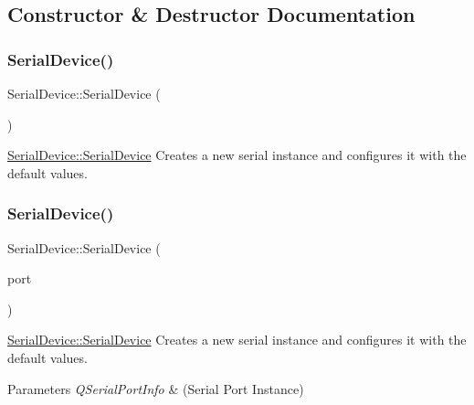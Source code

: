 \subsection{Constructor \& Destructor Documentation}
\hypertarget{class_serial_device_aad126bede3b0adf49e1fbe3afd7c6c42}{}\label{class_serial_device_aad126bede3b0adf49e1fbe3afd7c6c42} 
\subsubsection{\texorpdfstring{Serial\+Device()}{SerialDevice()}\hspace{0.1cm}{\footnotesize\ttfamily [1/5]}}
{\footnotesize\ttfamily Serial\+Device\+::\+Serial\+Device (\begin{DoxyParamCaption}{ }\end{DoxyParamCaption})}



\hyperlink{class_serial_device_aad126bede3b0adf49e1fbe3afd7c6c42}{Serial\+Device\+::\+Serial\+Device} Creates a new serial instance and configures it with the default values. 

\hypertarget{class_serial_device_aa0b6d87aea8d882096abe85fda113b26}{}\label{class_serial_device_aa0b6d87aea8d882096abe85fda113b26} 
\subsubsection{\texorpdfstring{Serial\+Device()}{SerialDevice()}\hspace{0.1cm}{\footnotesize\ttfamily [2/5]}}
{\footnotesize\ttfamily Serial\+Device\+::\+Serial\+Device (\begin{DoxyParamCaption}\item[{Q\+Serial\+Port\+Info}]{port }\end{DoxyParamCaption})}



\hyperlink{class_serial_device_aad126bede3b0adf49e1fbe3afd7c6c42}{Serial\+Device\+::\+Serial\+Device} Creates a new serial instance and configures it with the default values. 


\begin{DoxyParams}{Parameters}
{\em Q\+Serial\+Port\+Info} & (Serial Port Instance) \\
\hline
\end{DoxyParams}
\hypertarget{class_serial_device_acd6d42b1547bef45569e20ba75cd024a}{}\label{class_serial_device_acd6d42b1547bef45569e20ba75cd024a} 
